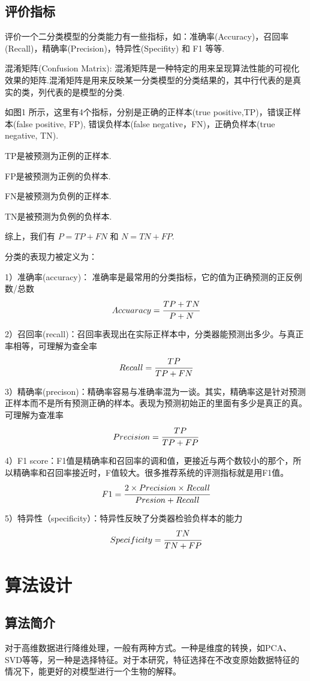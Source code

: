 \documentclass{njubachelor}
\begin{document}
\subsection{评价指标}
评价一个二分类模型的分类能力有一些指标，如：准确率(Accuracy)，召回率(Recall)，精确率(Precision)，特异性(Specifity) 和 F1 等等.

混淆矩阵(Confusion Matrix): 混淆矩阵是一种特定的用来呈现算法性能的可视化效果的矩阵.混淆矩阵是用来反映某一分类模型的分类结果的，其中行代表的是真实的类，列代表的是模型的分类.


如图1 所示，这里有4个指标，分别是正确的正样本(true positive,TP)，错误正样本(false positive, FP), 错误负样本(false negative，FN)，正确负样本(true negative, TN).

TP是被预测为正例的正样本.

FP是被预测为正例的负样本.

FN是被预测为负例的正样本.

TN是被预测为负例的负样本.

综上，我们有 $P = TP + FN$ 和 $N = TN + FP$.

分类的表现力被定义为：

1）准确率(accuracy)：	准确率是最常用的分类指标，它的值为正确预测的正反例数/总数
$$Accuaracy = \cfrac{TP+TN}{P+N}$$                                 

2）召回率(recall)：召回率表现出在实际正样本中，分类器能预测出多少。与真正率相等，可理解为查全率
$$Recall = \cfrac{TP}{TP + FN}$$        

3）精确率(precison)：精确率容易与准确率混为一谈。其实，精确率这是针对预测正样本而不是所有预测正确的样本。表现为预测初始正的里面有多少是真正的真。可理解为查准率
$$Precision = \cfrac{TP}{TP+FP}$$
                                       
4）F1 score：F1值是精确率和召回率的调和值，更接近与两个数较小的那个，所以精确率和召回率接近时，F值较大。很多推荐系统的评测指标就是用F1值。
$$F1 = \cfrac{2\times Precision \times Recall}{Presion + Recall}$$

5）特异性（specificity）：特异性反映了分类器检验负样本的能力
$$Specificity = \cfrac{TN}{TN+FP}$$

\section{算法设计}
\subsection{算法简介}
对于高维数据进行降维处理，一般有两种方式。一种是维度的转换，如PCA、SVD等等，另一种是选择特征。对于本研究，特征选择在不改变原始数据特征的情况下，能更好的对模型进行一个生物的解释。
\end{document}
